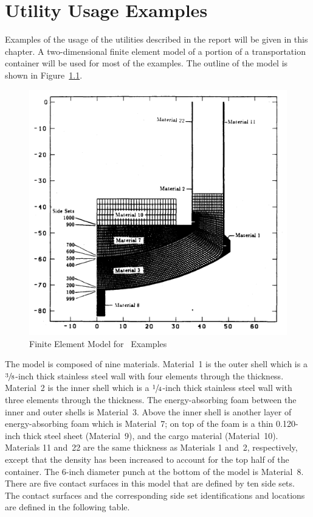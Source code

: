 \chapter{Utility Usage Examples}\label{c:examples}

Examples of the usage of the utilities described in the report will be
given in this chapter.  A two-dimensional finite element model of a
portion of a transportation container will be used for most of the
examples.  The outline of the model is shown in Figure~\ref{exmodel}.
\begin{figure}
\centering
\includegraphics[scale=0.75]{figures/Model.png}
\caption{Finite Element Model for \numbers\ Examples}\label{exmodel}
\end{figure}
The model is composed of nine materials.  Material~1 is the outer shell
which is a $\sfrac{3}{8}$-inch thick stainless steel wall with four
elements through the thickness.  Material~2 is the inner shell which is
a $\sfrac{1}{4}$-inch thick stainless steel wall with three elements
through the thickness.  The energy-absorbing foam between the inner and
outer shells is Material~3.  Above the inner shell is another layer of
energy-absorbing foam which is Material~7;  on top of the foam is a thin
0.120-inch thick steel sheet (Material~9), and the cargo material
(Material~10).  Materials 11 and~22 are the same thickness as Materials
1 and~2, respectively, except that the density has been increased to
account for the top half of the container.  The 6-inch diameter punch at
the bottom of the model is Material~8.  There are five contact surfaces
in this model that are defined by ten side sets.  The contact surfaces
and the corresponding side set identifications and locations are defined
in the following table.

